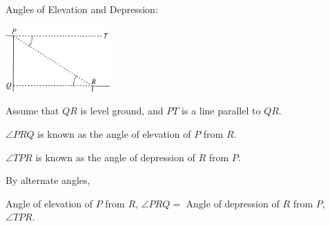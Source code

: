 \documentclass[twocolumn]{article}
\begin{document}
\bigskip

\noindent 
Angles of Elevation and Depression:

\includegraphics[width=0.3\textwidth]{105.png}

\bigskip

\noindent 
Assume that $QR$ is level ground, and $PT$ is a line parallel to $QR$.

\noindent
$\angle P R Q$ is known as the angle of elevation of $P$ from $R$.

\noindent
$\angle T P R$ is known as the angle of depression of $R$ from $P$.

\noindent
By alternate angles,

\noindent
Angle of elevation of $P$ from $R$, $\angle P R Q=$ Angle of depression of $R$ from $P$, $\angle T P R$.
\end{document}

